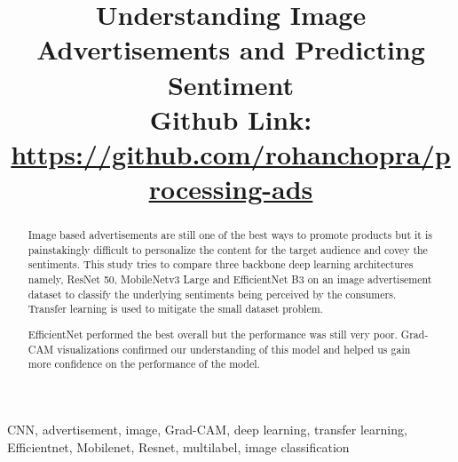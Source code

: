 \documentclass[conference]{IEEEtran}
\begin{document}
\title{Understanding Image Advertisements and Predicting Sentiment\\
{\footnotesize \textbf{Github Link:} \url{https://github.com/rohanchopra/processing-ads}}
}

\author{
\and
{}
}


\maketitle

\begin{abstract}
Image based advertisements are still one of the best ways to promote products 
but it is painstakingly difficult to personalize the content for the target audience 
and covey the sentiments. This study tries to compare three backbone deep learning 
architectures namely, ResNet 50, MobileNetv3 Large and EfficientNet B3 
on an image advertisement dataset to classify the underlying sentiments 
being perceived by the consumers. Transfer learning is used to mitigate the small 
dataset problem.

EfficientNet performed the best overall but the performance was still very poor. Grad-CAM visualizations
confirmed our understanding of this model and helped us gain more confidence on the performance of the model.
\end{abstract}

\begin{IEEEkeywords}
CNN, advertisement, image, Grad-CAM, deep learning, transfer learning, Efficientnet, Mobilenet, Resnet, multilabel, image classification
\end{IEEEkeywords}
\end{document}
